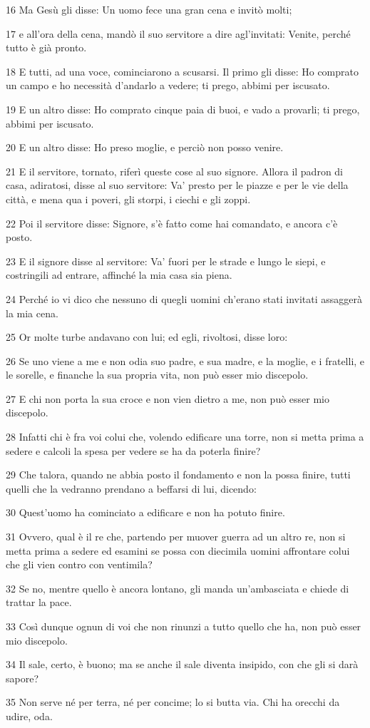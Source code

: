 \par 16 Ma Gesù gli disse: Un uomo fece una gran cena e invitò molti;
\par 17 e all'ora della cena, mandò il suo servitore a dire agl'invitati: Venite, perché tutto è già pronto.
\par 18 E tutti, ad una voce, cominciarono a scusarsi. Il primo gli disse: Ho comprato un campo e ho necessità d'andarlo a vedere; ti prego, abbimi per iscusato.
\par 19 E un altro disse: Ho comprato cinque paia di buoi, e vado a provarli; ti prego, abbimi per iscusato.
\par 20 E un altro disse: Ho preso moglie, e perciò non posso venire.
\par 21 E il servitore, tornato, riferì queste cose al suo signore. Allora il padron di casa, adiratosi, disse al suo servitore: Va' presto per le piazze e per le vie della città, e mena qua i poveri, gli storpi, i ciechi e gli zoppi.
\par 22 Poi il servitore disse: Signore, s'è fatto come hai comandato, e ancora c'è posto.
\par 23 E il signore disse al servitore: Va' fuori per le strade e lungo le siepi, e costringili ad entrare, affinché la mia casa sia piena.
\par 24 Perché io vi dico che nessuno di quegli uomini ch'erano stati invitati assaggerà la mia cena.
\par 25 Or molte turbe andavano con lui; ed egli, rivoltosi, disse loro:
\par 26 Se uno viene a me e non odia suo padre, e sua madre, e la moglie, e i fratelli, e le sorelle, e finanche la sua propria vita, non può esser mio discepolo.
\par 27 E chi non porta la sua croce e non vien dietro a me, non può esser mio discepolo.
\par 28 Infatti chi è fra voi colui che, volendo edificare una torre, non si metta prima a sedere e calcoli la spesa per vedere se ha da poterla finire?
\par 29 Che talora, quando ne abbia posto il fondamento e non la possa finire, tutti quelli che la vedranno prendano a beffarsi di lui, dicendo:
\par 30 Quest'uomo ha cominciato a edificare e non ha potuto finire.
\par 31 Ovvero, qual è il re che, partendo per muover guerra ad un altro re, non si metta prima a sedere ed esamini se possa con diecimila uomini affrontare colui che gli vien contro con ventimila?
\par 32 Se no, mentre quello è ancora lontano, gli manda un'ambasciata e chiede di trattar la pace.
\par 33 Così dunque ognun di voi che non rinunzi a tutto quello che ha, non può esser mio discepolo.
\par 34 Il sale, certo, è buono; ma se anche il sale diventa insipido, con che gli si darà sapore?
\par 35 Non serve né per terra, né per concime; lo si butta via. Chi ha orecchi da udire, oda.

